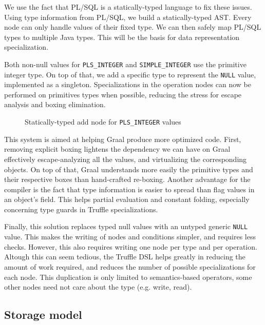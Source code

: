 \documentclass[twoside,11pt,a4paper]{article}
\newcommand{\pls}[1]{\small\texttt{#1}\normalsize}
\newcommand{\plstype}[1]{\pls{#1}}
\newcommand{\plsi}{\plstype{PLS\_INTEGER}}
\newcommand{\simpleint}{\plstype{SIMPLE\_INTEGER}}
\newcommand{\plsnull}{\pls{NULL}}
\begin{document}
We use the fact that PL/SQL is a statically-typed language to fix these issues. Using type information from PL/SQL, we build a statically-typed AST. Every node can only handle values of their fixed type. We can then safely map PL/SQL types to multiple Java types. This will be the basis for data representation specialization.

Both non-null values for \plsi{} and \simpleint{} use the primitive integer type. On top of that, we add a specific type to represent the \plsnull{} value, implemented as a singleton. Specializations in the operation nodes can now be performed on primitives types when possible, reducing the stress for escape analysis and boxing elimination.

\begin{figure}[t]
	
	\caption{Statically-typed add node for \plsi{} values}
	\label{fig:plsiadd}
\end{figure}

This system is aimed at helping Graal produce more optimized code. First, removing explicit boxing lightens the dependency we can have on Graal effectively escape-analyzing all the values, and virtualizing the corresponding objects. On top of that, Graal understands more easily the primitive types and their respective boxes than hand-crafted re-boxing. Another advantage for the compiler is the fact that type information is easier to spread than flag values in an object's field. This helps partial evaluation and constant folding, especially concerning type guards in Truffle specializations.

Finally, this solution replaces typed null values with an untyped generic \plsnull{} value. This makes the writing of nodes and conditions simpler, and requires less checks. However, this also requires writing one node per type and per operation. Altough this can seem tedious, the Truffle DSL helps greatly in reducing the amount of work required, and reduces the number of possible specializations for each node. This duplication is only limited to semantics-based operators, some other nodes need not care about the type (e.g. write, read).

\subsection{Storage model}
\end{document}
